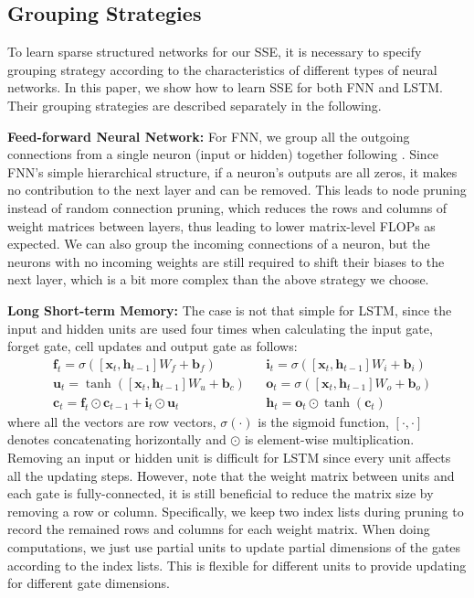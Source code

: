 \documentclass{article} %
\begin{document}
\subsection{Grouping Strategies}
\label{GS}
To learn sparse structured networks for our SSE, it is necessary to specify grouping strategy according to the characteristics of different types of neural networks. In this paper, we show how to learn SSE for both FNN and LSTM. Their grouping strategies are described separately in the following.

\textbf{Feed-forward Neural Network:} For FNN, we group all the outgoing connections from a single neuron (input or hidden) together following \citet{scardapane2017group}. Since FNN's simple hierarchical structure, if a neuron's outputs are all zeros, it makes no contribution to the next layer and can be removed. This leads to node pruning instead of random connection pruning, which reduces the rows and columns of weight matrices between layers, thus leading to lower matrix-level FLOPs as expected. 
We can also group the incoming connections of a neuron, but the neurons with no incoming weights are still required to shift their biases to the next layer, which is a bit more complex than the above strategy we choose.

\textbf{Long Short-term Memory:} The case is not that simple for LSTM, since the input and hidden units are used four times when calculating the input gate, forget gate, cell updates and output gate as follows:
\begin{equation}
\label{eq8}
\begin{aligned}
&\bm{f}_t = \sigma([\bm{x}_t, \bm{h}_{t-1}]W_f+\bm{b}_f)&
&\bm{i}_t = \sigma([\bm{x}_t, \bm{h}_{t-1}]W_i+\bm{b}_i) \\
&\bm{u}_t = \tanh([\bm{x}_t, \bm{h}_{t-1}]W_u+\bm{b}_c) &
&\bm{o}_t = \sigma([\bm{x}_t, \bm{h}_{t-1}]W_o+\bm{b}_o) \\
&\bm{c}_t=\bm{f}_t\odot\bm{c}_{t-1}+\bm{i}_t\odot\bm{u}_t &
&\bm{h}_t=\bm{o}_t\odot\tanh(\bm{c}_t)
\end{aligned}
\end{equation}
where all the vectors are row vectors, $ \sigma(\cdot) $ is the sigmoid function, $ [\cdot,\cdot] $ denotes concatenating horizontally and $ \odot $ is element-wise multiplication. Removing an input or hidden unit is difficult for LSTM since every unit affects all the updating steps. 
However, note that the weight matrix between units and each gate is fully-connected, it is still beneficial to reduce the matrix size by removing a row or column. 
Specifically, we keep two index lists during pruning to record the remained rows and columns for each weight matrix. When doing computations, we just use partial units to update partial dimensions of the gates according to the index lists. This is flexible for different units to provide updating for different gate dimensions.
\end{document}
